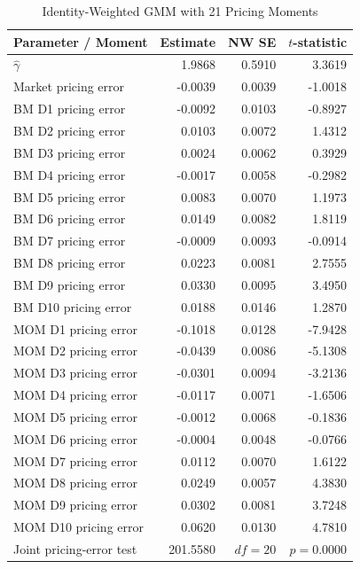 \begin{table}[H]
  \centering
  \caption{Identity-Weighted GMM with 21 Pricing Moments}
  \label{tab:3e-gmm}
  \begin{minipage}{0.98\textwidth}
    \centering
    \scriptsize
    \begin{tabular*}{\linewidth}{@{\extracolsep{\fill}}lrrr@{}}
      \toprule
      Parameter / Moment & Estimate & NW SE & $t$-statistic \\
      \midrule
      $\hat{\gamma}$ & 1.9868 & 0.5910 & 3.3619 \\
      Market pricing error & -0.0039 & 0.0039 & -1.0018 \\
      BM D1 pricing error & -0.0092 & 0.0103 & -0.8927 \\
      BM D2 pricing error & 0.0103 & 0.0072 & 1.4312 \\
      BM D3 pricing error & 0.0024 & 0.0062 & 0.3929 \\
      BM D4 pricing error & -0.0017 & 0.0058 & -0.2982 \\
      BM D5 pricing error & 0.0083 & 0.0070 & 1.1973 \\
      BM D6 pricing error & 0.0149 & 0.0082 & 1.8119 \\
      BM D7 pricing error & -0.0009 & 0.0093 & -0.0914 \\
      BM D8 pricing error & 0.0223 & 0.0081 & 2.7555 \\
      BM D9 pricing error & 0.0330 & 0.0095 & 3.4950 \\
      BM D10 pricing error & 0.0188 & 0.0146 & 1.2870 \\
      MOM D1 pricing error & -0.1018 & 0.0128 & -7.9428 \\
      MOM D2 pricing error & -0.0439 & 0.0086 & -5.1308 \\
      MOM D3 pricing error & -0.0301 & 0.0094 & -3.2136 \\
      MOM D4 pricing error & -0.0117 & 0.0071 & -1.6506 \\
      MOM D5 pricing error & -0.0012 & 0.0068 & -0.1836 \\
      MOM D6 pricing error & -0.0004 & 0.0048 & -0.0766 \\
      MOM D7 pricing error & 0.0112 & 0.0070 & 1.6122 \\
      MOM D8 pricing error & 0.0249 & 0.0057 & 4.3830 \\
      MOM D9 pricing error & 0.0302 & 0.0081 & 3.7248 \\
      MOM D10 pricing error & 0.0620 & 0.0130 & 4.7810 \\
      \midrule
      Joint pricing-error test & 201.5580 & $df=20$ & $p=0.0000$ \\
      \bottomrule
    \end{tabular*}


\end{minipage}
\end{table}
